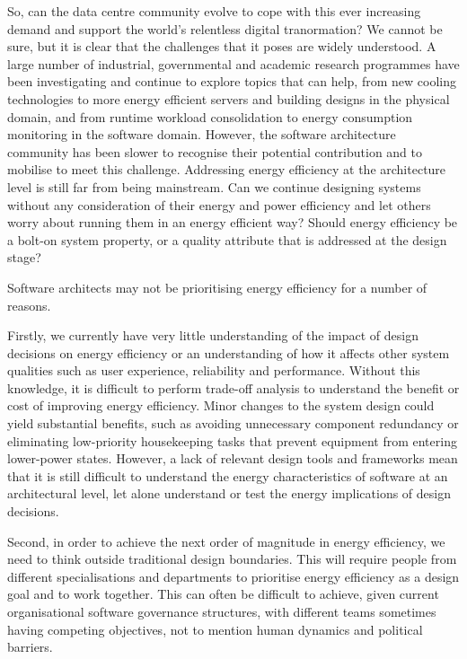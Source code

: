 So, can the data centre community evolve to cope with this ever increasing demand and support the world's relentless digital tranormation? We cannot be sure, but it is clear that the challenges that it poses are widely understood.  A large number of industrial, governmental and academic research programmes \cite{loken2010-scinet, greengrid2011-dcefficiency, dc4cities2014_dcmetrics,ida2015-gdcip} have been investigating and continue to explore topics that can help, from new cooling technologies to more energy efficient servers and building designs in the physical domain, and from runtime workload consolidation to energy consumption monitoring in the software domain. However, the software architecture community has been slower to recognise their potential contribution and to mobilise to meet this challenge. Addressing energy efficiency at the architecture level is still far from being mainstream. Can we continue designing systems without any consideration of their energy and power efficiency and let others worry about running them in an energy efficient way? Should energy efficiency be a bolt-on system property, or a quality attribute that is addressed at the design stage?

Software architects may not be prioritising energy efficiency for a number of reasons.

Firstly, we currently have very little understanding of the impact of design decisions on energy efficiency or an understanding of how it affects other system qualities such as user experience, reliability and performance.  Without this knowledge, it is difficult to perform trade-off analysis to understand the benefit or cost of improving energy efficiency. Minor changes to the system design could yield substantial benefits, such as avoiding unnecessary component redundancy or eliminating low-priority housekeeping tasks that prevent equipment from entering lower-power states. However, a lack of relevant design tools and frameworks mean that it is still difficult to understand the energy characteristics of software at an architectural level, let alone understand or test the energy implications of design decisions. 

Second, in order to achieve the next order of magnitude in energy efficiency, we need to think outside traditional design boundaries. This will require people from different specialisations and departments to prioritise energy efficiency as a design goal and to work together. This can often be difficult to achieve, given current organisational software governance structures, with different teams sometimes having competing objectives, not to mention human dynamics and political barriers.

